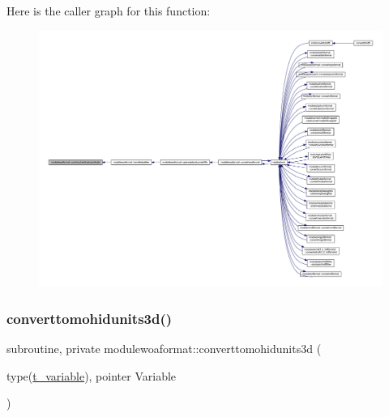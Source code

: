 Here is the caller graph for this function\+:\nopagebreak
\begin{figure}[H]
\begin{center}
\leavevmode
\includegraphics[width=350pt]{namespacemodulewoaformat_a67b34e0648f36008251527dc7f49084b_icgraph}
\end{center}
\end{figure}
\mbox{\label{namespacemodulewoaformat_aefda2556422f044d5397391c5c5acb66}} 
\subsubsection{\texorpdfstring{converttomohidunits3d()}{converttomohidunits3d()}}
{\footnotesize\ttfamily subroutine, private modulewoaformat\+::converttomohidunits3d (\begin{DoxyParamCaption}\item[{type(\mbox{\hyperlink{structmodulewoaformat_1_1t__variable}{t\+\_\+variable}}), pointer}]{Variable }\end{DoxyParamCaption})\hspace{0.3cm}{\ttfamily [private]}}

